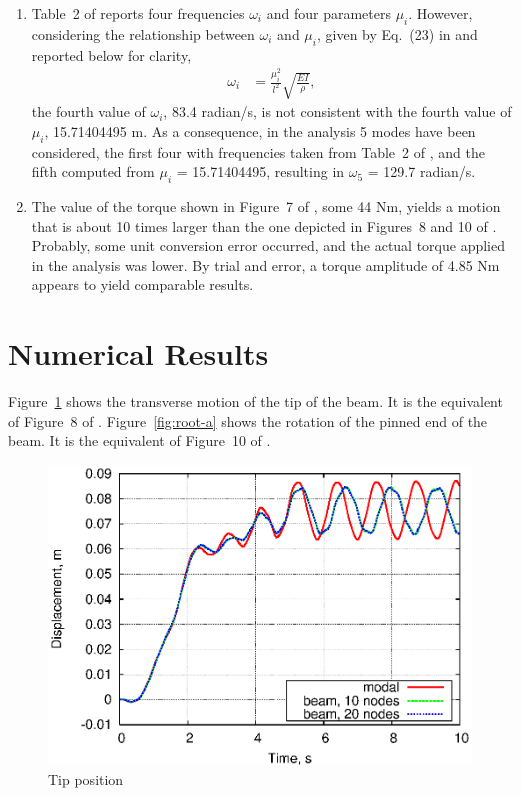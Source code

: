 \documentclass[11pt, a4paper, subeqn]{article}
\begin{document}
\begin{enumerate}
\item Table~2 of \cite{MACLEAN-2007} reports four frequencies $\omega_i$ 
and four parameters $\mu_i$.
However, considering the relationship between $\omega_i$ and $\mu_i$,
given by Eq.~(23) in \cite{MACLEAN-2007} and reported below for clarity,
\begin{align}
	\omega_i
	&=
	\frac{\mu_i^2}{l^2} \sqrt{\frac{EI}{\rho}}
	,
\end{align}
the fourth value of $\omega_i$, 83.4 radian/s, is not consistent
with the fourth value of $\mu_i$, 15.71404495 m.
As a consequence, in the analysis 5 modes have been considered,
the first four with frequencies taken from Table~2 of \cite{MACLEAN-2007},
and the fifth computed from $\mu_i$ = 15.71404495, resulting in
$\omega_5$ = 129.7 radian/s.

\item The value of the torque shown in Figure~7 of \cite{MACLEAN-2007},
some 44 Nm, yields a motion that is about 10 times larger than the one
depicted in Figures~8 and 10 of \cite{MACLEAN-2007}.
Probably, some unit conversion error occurred, and the actual torque
applied in the analysis was lower.
By trial and error, a torque amplitude of 4.85 Nm appears to yield
comparable results.
\end{enumerate}

\section*{Numerical Results}
Figure~\ref{fig:tip-y} shows the transverse motion of the tip of the beam.
It is the equivalent of Figure~8 of \cite{MACLEAN-2007}.
Figure~\ref{fig:root-a} shows the rotation of the pinned end of the beam.
It is the equivalent of Figure~10 of \cite{MACLEAN-2007}.

\begin{figure}
\centering
\includegraphics[width=.8\textwidth]{tip-y.eps}
\caption{Tip position}
\label{fig:tip-y}
\end{figure}
\end{document}

